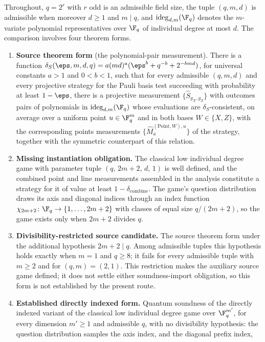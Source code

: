\documentclass[11pt]{article}
\begin{document}
Throughout, $q = 2^r$ with $r$ odd is an admissible field size, the tuple
$(q,m,d)$ is admissible when moreover $d \ge 1$ and $m \mid q$, and
$\mathrm{ideg}_{d,m}(\F_q)$ denotes the $m$-variate polynomial representatives
over $\F_q$ of individual degree at most $d$.  The comparison involves four
theorem forms.
\begin{enumerate}
  \item \textbf{Source theorem form} (the polynomial-pair measurement).  There
  is a function $\delta_S(\eps,m,d,q) = a(md)^a(\eps^b + q^{-b} + 2^{-bmd})$,
  for universal constants $a > 1$ and $0 < b < 1$, such that for every
  admissible $(q,m,d)$ and every projective strategy for the Pauli basis test
  succeeding with probability at least $1-\eps$, there is a projective
  measurement $\{\hat S_{g_X,g_Z}\}$ with outcomes pairs of polynomials in
  $\mathrm{ideg}_{d,m}(\F_q)$ whose evaluations are $\delta_S$-consistent, on
  average over a uniform point $u \in \F_q^m$ and in both bases
  $W \in \{X,Z\}$, with the corresponding points measurements
  $\{\hat M^{(\mathrm{Point},W),u}_a\}$ of the strategy, together with the
  symmetric counterpart of this relation.
  \item \textbf{Missing instantiation obligation.}  The classical low
  individual degree game with parameter tuple $(q,\, 2m+2,\, d,\, 1)$ is well
  defined, and the combined point and line measurements assembled in the
  analysis constitute a strategy for it of value at least
  $1 - \delta_{\mathrm{combine}}$.  The game's question distribution draws
  its axis and diagonal indices through an index function
  $\chi_{2m+2}\colon \F_q \to \{1,\ldots,2m+2\}$ with classes of equal size
  $q/(2m+2)$, so the game exists only when $2m+2$ divides $q$.
  \item \textbf{Divisibility-restricted source candidate.}  The source theorem
  form under the additional hypothesis $2m+2 \mid q$.  Among
  admissible tuples this hypothesis holds exactly when $m = 1$ and
  $q \ge 8$; it fails for every admissible tuple with $m \ge 2$ and for
  $(q,m) = (2,1)$.  This restriction makes the auxiliary source game defined;
  it does not settle either soundness-import obligation, so this form is not
  established by the present route.
  \item \textbf{Established directly indexed form.}  Quantum
  soundness of the directly indexed variant of the classical low individual
  degree game over $\F_q^{m'}$, for every dimension $m' \ge 1$ and
  admissible $q$, with no divisibility hypothesis: the question
  distribution samples the axis index, and the diagonal prefix index,

\end{enumerate}
\end{document}
